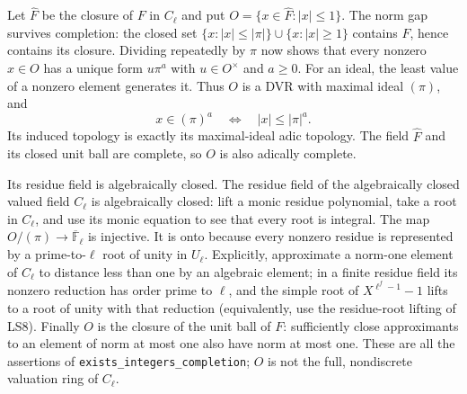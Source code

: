 Let $\widehat F$ be the closure of $F$ in $C_\ell$ and put
$O=\{x\in\widehat F:|x|\le1\}$. The norm gap survives completion:
the closed set
$\{x:|x|\le|\pi|\}\cup\{x:|x|\ge1\}$ contains $F$, hence
contains its closure. Dividing repeatedly by $\pi$ now shows that
every nonzero $x\in O$ has a unique form $u\pi^a$ with $u\in O^\times$
and $a\ge0$. For an ideal, the least value of a nonzero element
generates it. Thus $O$ is a DVR with maximal ideal $(\pi)$, and
\[
 x\in(\pi)^a\quad\Longleftrightarrow\quad |x|\le|\pi|^a.
                                                               \tag{NR.9}
\]
Its induced topology is exactly its maximal-ideal adic topology.
The field $\widehat F$ and its closed unit ball are complete, so $O$
is also adically complete.

Its residue field is algebraically closed. The residue field of
the algebraically closed valued field $C_\ell$ is algebraically
closed: lift a monic residue polynomial, take a root in $C_\ell$,
and use its monic equation to see that every root is integral.
The map $O/(\pi)\to\overline{\mathbb F}_\ell$ is injective.
It is onto because every nonzero residue is represented by a
prime-to-$\ell$ root of unity in $U_\ell$. Explicitly, approximate
a norm-one element of $C_\ell$ to distance less than one by an
algebraic element; in a finite residue field its nonzero reduction
has order prime to $\ell$, and the simple root of
$X^{\ell^f-1}-1$ lifts to a root of unity with that reduction
(equivalently, use the residue-root lifting of LS8).
Finally $O$ is the closure of the unit ball of $F$: sufficiently
close approximants to an element of norm at most one also have
norm at most one. These are all the assertions of
\texttt{exists\_integers\_completion}; $O$ is not the full,
nondiscrete valuation ring of $C_\ell$.

